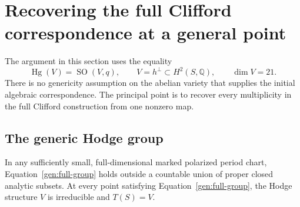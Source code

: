 \section{Recovering the full Clifford correspondence at a general point}
\label{gen:section}

The argument in this section uses the equality
\begin{equation}\label{gen:full-group}
 \operatorname{Hg}(V)=\operatorname{SO}(V,q),
 \qquad V=h^\perp\subset H^2(S,\mathbb Q),\qquad \dim V=21.
\end{equation}
There is no genericity assumption on the abelian variety that supplies the
initial algebraic correspondence.  The principal point is to recover every
multiplicity in the full Clifford construction from one nonzero map.

\subsection{The generic Hodge group}

\begin{proposition}\label{gen:genericity}
In any sufficiently small, full-dimensional marked polarized period chart,
Equation~\eqref{gen:full-group} holds outside a countable union of proper
closed analytic subsets.  At every point satisfying
Equation~\eqref{gen:full-group}, the Hodge structure $V$ is irreducible and
$T(S)=V$.
\end{proposition}


